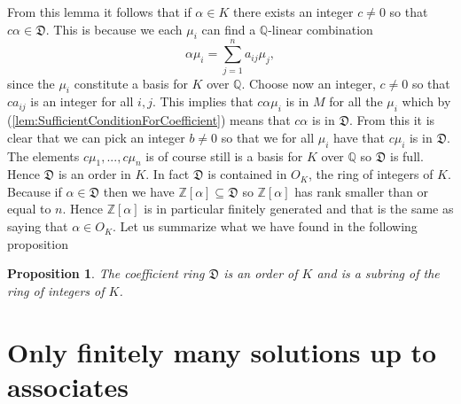 \documentclass{article}
\newtheorem{proposition}{Proposition}[section]
\newcommand{\mfrak}[1]{\mathfrak{#1}}
\newcommand{\mbb}[1]{\mathbb{#1}}
\begin{document}
From this lemma it follows that if $\alpha \in K$ there exists an integer $c \neq 0$ so that $c \alpha \in \mfrak D$. This is because we each $\mu_i$ can find a $\mbb Q$-linear combination
$$\alpha \mu_i = \sum_{j=1}^n a_{ij} \mu_j,$$
since the $\mu_i$ constitute a basis for $K$ over $\mbb Q$. Choose now an integer, $c \neq 0$ so that $c a_{ij}$ is an integer for all $i,j$. This implies that $c \alpha \mu_i$ is in $M$ for all the $\mu_i$ which by (\ref{lem:SufficientConditionForCoefficient}) means that $c \alpha$ is in $\mfrak D$. From this it is clear that we can pick an integer $b \neq 0$ so that we for all $\mu_i$ have that $c \mu_i$ is in $\mfrak D$. The elements $c \mu_1, ..., c\mu_n$ is of course still is a basis for $K$ over $\mbb Q$ so $\mfrak D$ is full. Hence $\mfrak D$ is an order in $K$. In fact $\mfrak D$ is contained in $O_K$, the ring of integers of $K$. Because if $\alpha \in \mfrak D$ then we have $\mbb Z[\alpha] \subseteq \mfrak D$ so $\mbb Z[\alpha]$ has rank smaller than or equal to $n$. Hence $\mbb Z[\alpha]$ is in particular finitely generated and that is the same as saying that $\alpha \in O_K$. Let us summarize what we have found in the following proposition
\begin{proposition}
    The coefficient ring $\mfrak D$ is an order of $K$ and is a subring of the ring of integers of $K$.
\end{proposition}

\section{Only finitely many solutions up to associates}
\end{document}
